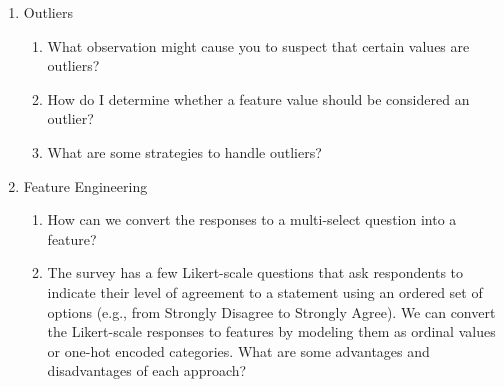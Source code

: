 \documentclass[12pt]{article}
\begin{document}
\begin{enumerate}
\begin{enumerate}
\item
Since you never see the missing value, it may not be possible to verify which
explanation holds. However, it would be useful to determine whether the missingness of a
feature is related to the label or not. If the missingness is related to the label, a
missing value itself provides a predictive signal. What is a common strategy for
determining this?

\item What are some common strategies to handle missing values? One is called
  imputation.

\item When is it appropriate to use each strategy above to handle missing values?

\item
Suppose that you decide to impute the median value for a numeric feature. Why is it
problematic to do the imputation on the validation and test sets?

\item Finally, decide how missing values should be handled for each feature in our
  dataset, and record your decision.

\end{enumerate}

\item Outliers

\begin{enumerate}

\item What observation might cause you to suspect that certain values are outliers?

\item How do I determine whether a feature value should be considered an outlier?

\item What are some strategies to handle outliers?

\end{enumerate}

\item Feature Engineering

\begin{enumerate}

\item How can we convert the responses to a multi-select question into a feature?

\item The survey has a few Likert-scale questions that ask respondents to indicate their
  level of agreement to a statement using an ordered set of options (e.g., from Strongly
  Disagree to Strongly Agree). We can convert the Likert-scale responses to features by
  modeling them as ordinal values or one-hot encoded categories. What are some
  advantages and disadvantages of each approach?


\end{enumerate}
\end{enumerate}
\end{document}
